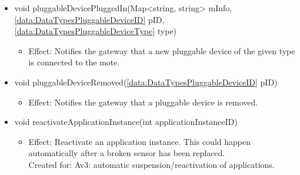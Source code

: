 \begin{description}
\begin{itemize}[noitemsep,nolistsep,leftmargin=-.25cm]
\begin{itemize}
        \end{itemize}
      \item \textsf{void pluggableDevicePluggedIn(Map\textless{}string, string\textgreater{} mInfo, \ref{data:DataTypesPluggableDeviceID} pID, \ref{data:DataTypesPluggableDeviceType} type)}
        \begin{itemize}[noitemsep,nolistsep]
           \item Effect: Notifies the gateway that a new pluggable device of the given type is connected to the mote.
        \end{itemize}
      \item \textsf{void pluggableDeviceRemoved(\ref{data:DataTypesPluggableDeviceID} pID)}
        \begin{itemize}[noitemsep,nolistsep]
           \item Effect: Notifies the gateway that a pluggable device is removed.
        \end{itemize}
      \item \textsf{void reactivateApplicationInstance(int applicationInstanceID)}
        \begin{itemize}[noitemsep,nolistsep]
           \item Effect: Reactivate an application instance. This could happen automatically after a broken sensor has been replaced. \\
Created for: Av3: automatic suspension/reactivation of applications.
        \end{itemize}
    \end{itemize}
    \end{description}

